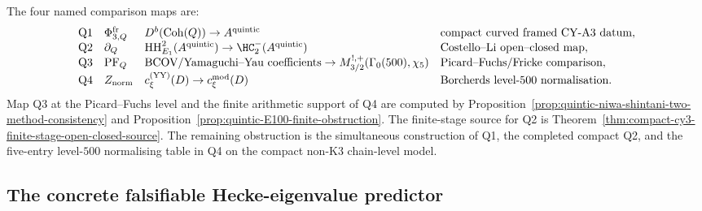 \begin{theorem}
The four named comparison maps are:
\[
\begin{array}{llll}
\textup{Q1} &
\Phi_{3,Q}^{\mathrm{fr}} &
D^b(\Coh(Q))\to A^{\mathrm{quintic}} &
\text{compact curved framed CY-A3 datum},\\
\textup{Q2} &
\partial_Q &
\HH^2_{E_1}(A^{\mathrm{quintic}})\to\HC^-_2(A^{\mathrm{quintic}}) &
\text{Costello--Li open--closed map},\\
\textup{Q3} &
\mathrm{PF}_Q &
\text{BCOV/Yamaguchi--Yau coefficients}\to M^{!,+}_{3/2}(\Gamma_0(500),\chi_5) &
\text{Picard--Fuchs/Fricke comparison},\\
\textup{Q4} &
Z_{\mathrm{norm}} &
c_{\xi}^{(\mathrm{YY})}(D)\to c_{\xi}^{\mathrm{mod}}(D) &
\text{Borcherds level-500 normalisation}.
\end{array}
\]
Map \textup{Q3} at the Picard--Fuchs level and the finite arithmetic
support of \textup{Q4} are computed by
Proposition~\ref{prop:quintic-niwa-shintani-two-method-consistency} and
Proposition~\ref{prop:quintic-E100-finite-obstruction}. The
finite-stage source for \textup{Q2} is
Theorem~\ref{thm:compact-cy3-finite-stage-open-closed-source}. The
remaining obstruction is the simultaneous construction of \textup{Q1},
the completed compact \textup{Q2}, and the five-entry level-$500$
normalising table in \textup{Q4} on the compact non-K3 chain-level model.
\end{theorem}

\subsection{The concrete falsifiable Hecke-eigenvalue predictor}
\label{subsec:quintic-falsifiable-predictor}

